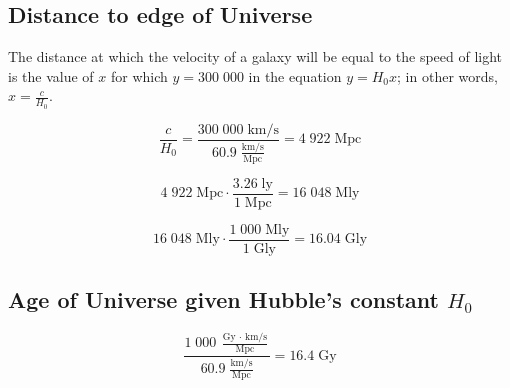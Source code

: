 \documentclass[11pt]{article}
\begin{document}
\subsection*{Distance to edge of Universe}
The distance at which the velocity of a galaxy will be equal to the speed of light is the value of $x$ for which $y = 300\;000$ in the equation $y = H_0x$; in other words, $x = \frac{c}{H_0}$.

\[\frac{c}{H_0} = \frac{300\;000\;\textrm{km/s}}{60.9\;\frac{\textrm{km/s}}{\textrm{Mpc}}} = 4\;922\;\textrm{Mpc}\]

\[4\;922\;\textrm{Mpc} \cdot \frac{3.26\;\textrm{ly}}{1\;\textrm{Mpc}} = 16\;048\;\textrm{Mly}\]

\[16\;048\;\textrm{Mly} \cdot \frac{1\;000\;\textrm{Mly}}{1\;\textrm{Gly}} = 16.04\;\textrm{Gly}\]

\subsection*{Age of Universe given Hubble's constant $H_0$}
\[\frac{1\;000\;\frac{\textrm{Gy $\cdot$ km/s}}{\textrm{Mpc}}}{60.9\;\frac{\textrm{km/s}}{\textrm{Mpc}}} = 16.4\;\textrm{Gy}\]
\end{document}
